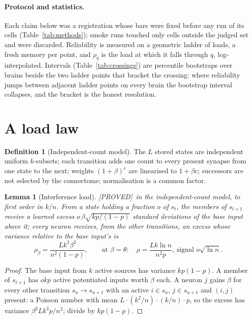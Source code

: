 \documentclass[11pt]{article}
\theoremstyle{definition}
\newtheorem{definition}{Definition}
\theoremstyle{plain}
\newtheorem{lemma}{Lemma}
\newcommand{\PROVED}{\textnormal{\footnotesize\textsf{[PROVED]}}}
\begin{document}
\paragraph{Protocol and statistics.} Each claim below was a registration whose
bars were fixed before any run of its cells (Table~\ref{tab:methods}); smoke runs
touched only cells outside the judged set and were discarded. Reliability is
measured on a geometric ladder of loads, a fresh memory per point, and
$\rho_q$ is the load at which it falls through $q$, log-interpolated. Intervals
(Table~\ref{tab:crossings}) are percentile bootstraps over brains
\citep{efron1979bootstrap} beside the two ladder points that bracket the
crossing: where reliability jumps between adjacent ladder points on every brain
the bootstrap interval collapses, and the bracket is the honest resolution.

\section{A load law}\label{sec:law}

\begin{definition}[Independent-count model]\label{def:icm}
The $L$ stored states are independent uniform $k$-subsets; each transition adds
one count to every present synapse from one state to the next; weights
$(1+\beta)^c$ are linearised to $1+\beta c$; successors are not selected by the
connectome; normalisation is a common factor.
\end{definition}

\begin{lemma}[Interference load]\label{lem:load} \PROVED\ in the
independent-count model, to first order in $k/n$. From a state holding a
fraction $o$ of $s_t$, the members of $s_{t+1}$ receive a learned excess
$o\,\beta\sqrt{kp/(1-p)}$ standard deviations of the base input above it; every
neuron receives, from the other transitions, an excess whose variance relative
to the base input's is
\[
  \rho_\beta = \frac{Lk^2\beta^2}{n^2(1-p)},
  \qquad\text{at } \beta = \theta:\quad
  \rho = \frac{Lk\ln n}{n^2p},\ \text{signal } o\sqrt{\ln n}.
\]
\end{lemma}

\begin{proof}
The base input from $k$ active sources has variance $kp(1-p)$. A member of
$s_{t+1}$ has $okp$ active potentiated inputs worth $\beta$ each. A neuron $j$
gains $\beta$ for every other transition $s_u\to s_{u+1}$ with an active $i \in
s_u$, $j\in s_{u+1}$ and $(i,j)$ present: a Poisson number with mean $L\cdot
(k^2/n)\cdot(k/n)\cdot p$, so the excess has variance $\beta^2Lk^3p/n^2$; divide
by $kp(1-p)$.
\end{proof}
\end{document}
